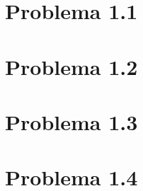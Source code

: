 \section{Problema 1.1}  \label{problema1_1}

\newpage

\section{Problema 1.2}  \label{problema1_2}

\newpage

\section{Problema 1.3}  \label{problema1_3}

\newpage

\section{Problema 1.4}  \label{problema1_4}
